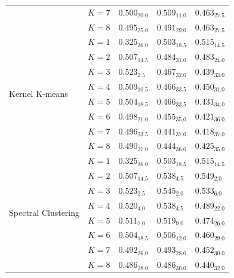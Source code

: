 \begin{table}[h]
\begin{tabular}{l|c|lll}
 & $K=7$ & $0.500_{20.0}$ & $0.509_{11.0}$ & $0.463_{27.5}$ \\
 & $K=8$ & $0.495_{25.0}$ & $0.491_{29.0}$ & $0.463_{27.5}$ \\
\midrule
\multirow[t]{8}{*}{Kernel K-means} & $K=1$ & $0.325_{36.0}$ & $0.503_{18.5}$ & $0.515_{14.5}$ \\
 & $K=2$ & $0.507_{14.5}$ & $0.484_{31.0}$ & $0.483_{24.0}$ \\
 & $K=3$ & $\mathbf{0.523_{2.5}}$ & $0.467_{32.0}$ & $0.439_{33.0}$ \\
 & $K=4$ & $0.509_{10.5}$ & $0.466_{33.5}$ & $0.450_{31.0}$ \\
 & $K=5$ & $0.504_{18.5}$ & $0.466_{33.5}$ & $0.431_{34.0}$ \\
 & $K=6$ & $0.498_{21.0}$ & $0.455_{35.0}$ & $0.421_{36.0}$ \\
 & $K=7$ & $0.496_{23.5}$ & $0.441_{37.0}$ & $0.418_{37.0}$ \\
 & $K=8$ & $0.490_{27.0}$ & $0.444_{36.0}$ & $0.425_{35.0}$ \\
\midrule
\multirow[t]{8}{*}{Spectral Clustering} & $K=1$ & $0.325_{36.0}$ & $0.503_{18.5}$ & $0.515_{14.5}$ \\
 & $K=2$ & $0.507_{14.5}$ & $0.538_{4.5}$ & $\mathbf{0.549_{2.0}}$ \\
 & $K=3$ & $\mathbf{0.523_{2.5}}$ & $\mathbf{0.545_{2.0}}$ & $0.533_{6.0}$ \\
 & $K=4$ & $0.520_{4.0}$ & $0.538_{4.5}$ & $0.489_{22.0}$ \\
 & $K=5$ & $0.511_{7.0}$ & $0.519_{9.0}$ & $0.474_{26.0}$ \\
 & $K=6$ & $0.504_{18.5}$ & $0.506_{12.0}$ & $0.460_{29.0}$ \\
 & $K=7$ & $0.492_{26.0}$ & $0.493_{28.0}$ & $0.452_{30.0}$ \\
 & $K=8$ & $0.486_{28.0}$ & $0.486_{30.0}$ & $0.440_{32.0}$ \\
\midrule
\end{tabular}
\label{tab:abilities_iris_wine_bc}
\end{table}




